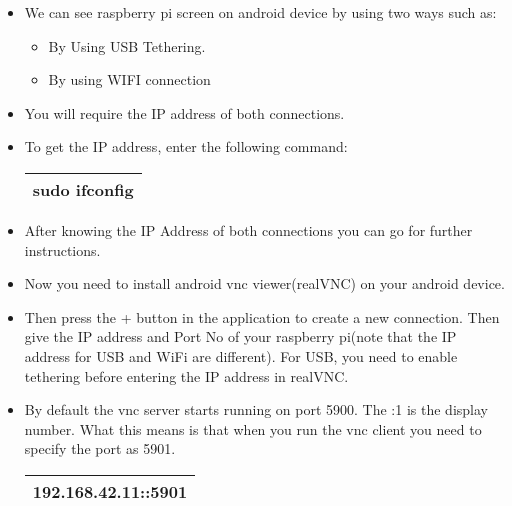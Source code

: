 \documentclass[journal,12pt,onecolumn]{IEEEtran}
\begin{document}
\begin{itemize}
\item We can see raspberry pi screen on android device by using two ways such as:

\begin{itemize}

\item By Using USB Tethering.
\item By using WIFI connection 

\end{itemize}

\item You will require the IP address of both connections.

\item To get the IP address, enter the following command:

\begin{table}[ht]
	\centering %
	\begin{tabular}{| c |} %
		\hline %
 			sudo ifconfig \\
		\hline
	\end{tabular}
	\centering
\end{table}

\item After knowing the IP Address of both connections you can go for further instructions.

\item Now you need to install android vnc viewer(realVNC) on your android device.

\item Then press the + button in the application to create a new connection. Then give the IP address and Port No of your raspberry pi(note that the IP address for USB and WiFi are different).  For USB, you need to enable tethering before entering the IP address in realVNC.

\item By default the vnc server starts running on port 5900. The :1 is the display number. What this means is that when you run the vnc client you need to specify the port as 5901.

\begin{table}[ht]
	\centering %
	\begin{tabular}{| c |} %
		\hline %
 			192.168.42.11::5901 \\
		\hline
	\end{tabular}
	\centering
\end{table}


\end{itemize}
\end{document}
